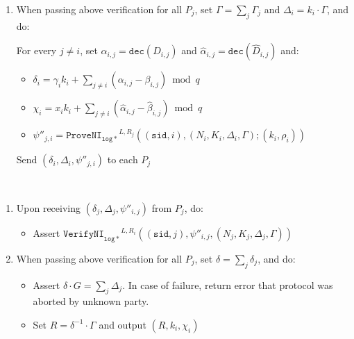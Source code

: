 \documentclass[11pt]{article}
\newcommand{\dec}{\ensuremath{\mathtt{dec}}}
\newcommand{\sid}{\ensuremath{\mathtt{sid}}}
\newcommand{\proveni}[1]{\ensuremath{\mathtt{ProveNI}_{\mathtt{#1}}}}
\newcommand{\verifyni}[1]{\ensuremath{\mathtt{VerifyNI}_{\mathtt{#1}}}}
\newcommand{\changed}[1]{\colorbox{Salmon}{$\displaystyle #1$}}
\newcommand{\?}[1]{\stackrel{?}{#1}}
\begin{document}
{\begin{description}
\begin{enumerate}
        \begin{itemize}
            \item Assert $\verifyni{aff\mbox{-}g}^{L,R_i}((\sid, j), \psi_{i,j}, (N_i, N_j, \changed{D_{i,j}, K_i}, F_{j,i}, \Gamma_j))$
            \item Assert $\verifyni{aff\mbox{-}g}^{L,R_i}((\sid, j), \hat{\psi}_{i,j}, (N_i, N_j, \changed{\hat{D}_{k,j}, K_i}, \hat{F}_{j,i}, X_j))$
            \item Assert $\verifyni{log*}^{L,R_i}((\sid, j), \psi'_{i,j}, (N_j, G_j, \Gamma_j, G))$
        \end{itemize}

        \item When passing above verification for all $P_j$, set $\Gamma = \sum_j \Gamma_j$ and $\Delta_i = k_i \cdot \Gamma$,
        and do:

        For every $j \ne i$, set $\alpha_{i,j} = \dec(D_{i,j})$ and $\hat{\alpha}_{i,j} = \dec(\hat{D}_{i,j})$ and:
        \begin{itemize}
            \item $\delta_i = \gamma_i k_i + \sum_{j \ne i}(\alpha_{i,j} - \beta_{i,j}) \bmod q$
            \item $\chi_i = x_i k_i + \sum_{j \ne i}(\hat{\alpha}_{i,j} - \hat{\beta}_{i,j}) \bmod q$
            \item $\psi''_{j,i} = \proveni{log*}^{L,R_j}((\sid, i), (N_i, K_i, \Delta_i, \Gamma); (k_i, \rho_i))$
        \end{itemize}

        Send $(\delta_i, \Delta_i, \psi''_{j,i})$ to each $P_j$
    \end{enumerate}

    \item[\textbf{Output}] \
    \begin{enumerate}
        \item Upon receiving $(\delta_j, \Delta_j, \psi''_{i,j})$ from $P_j$, do:
        \begin{itemize}
            \item Assert $\verifyni{log*}^{L,R_i}((\sid, j), \psi''_{i,j}, (N_j, K_j, \Delta_j, \Gamma))$
        \end{itemize}

        \item When passing above verification for all $P_j$, set $\delta = \sum_j \delta_j$, and do:
        \begin{itemize}
            \item Assert $\delta \cdot G = \sum_j \Delta_j$. In case of failure, return error that protocol was aborted by unknown party.
            \item Set $R = \delta^{-1} \cdot \Gamma$ and output $(R, k_i, \chi_i)$
        \end{itemize}
    \end{enumerate}
\end{description}
}



\end{document}
